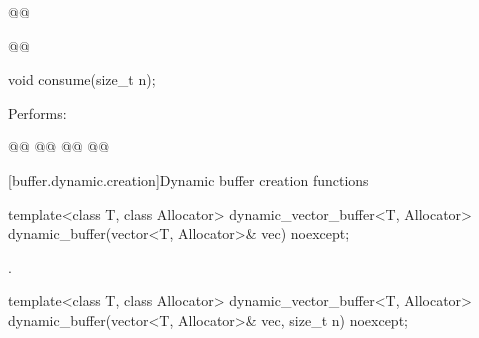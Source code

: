 %
\begin{itemdecl}
@@
\end{itemdecl}

\begin{itemdescr}
\addedpnum
{}

\addedpnum
{}
\end{itemdescr}

%
\begin{itemdecl}
@@
\end{itemdecl}

\begin{itemdescr}
\addedpnum
{}
\end{itemdescr}

%
\begin{itemdecl}
void consume(size_t n);
\end{itemdecl}

\begin{itemdescr}
\pnum
\effects Performs:
\begin{codeblock}
@@
@@
@@
@@
\end{codeblock}

\end{itemdescr}



[buffer.dynamic.creation]{Dynamic buffer creation functions}

%
\begin{itemdecl}
template<class T, class Allocator>
  dynamic_vector_buffer<T, Allocator>
  dynamic_buffer(vector<T, Allocator>& vec) noexcept;
\end{itemdecl}

\begin{itemdescr}
\pnum
\returns {}.
\end{itemdescr}

\begin{itemdecl}
template<class T, class Allocator>
  dynamic_vector_buffer<T, Allocator>
  dynamic_buffer(vector<T, Allocator>& vec, size_t n) noexcept;
\end{itemdecl}

